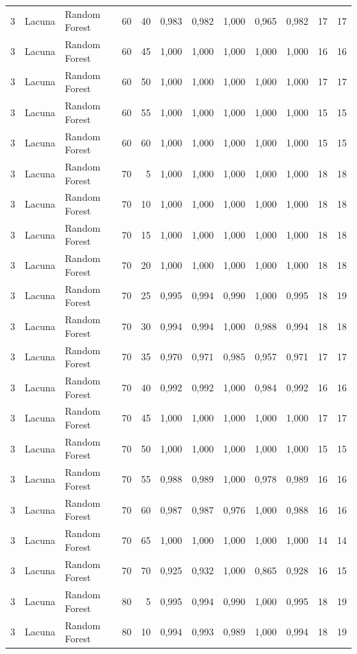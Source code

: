 \begin{longtable}{@{}rllrrrrrrrrr@{}}
3 & Lacuna & Random Forest & 60 & 40 & 0,983 & 0,982 & 1,000 & 0,965 & 0,982 & 17 & 17 \\
3 & Lacuna & Random Forest & 60 & 45 & 1,000 & 1,000 & 1,000 & 1,000 & 1,000 & 16 & 16 \\
3 & Lacuna & Random Forest & 60 & 50 & 1,000 & 1,000 & 1,000 & 1,000 & 1,000 & 17 & 17 \\
3 & Lacuna & Random Forest & 60 & 55 & 1,000 & 1,000 & 1,000 & 1,000 & 1,000 & 15 & 15 \\
3 & Lacuna & Random Forest & 60 & 60 & 1,000 & 1,000 & 1,000 & 1,000 & 1,000 & 15 & 15 \\
3 & Lacuna & Random Forest & 70 & 5 & 1,000 & 1,000 & 1,000 & 1,000 & 1,000 & 18 & 18 \\
3 & Lacuna & Random Forest & 70 & 10 & 1,000 & 1,000 & 1,000 & 1,000 & 1,000 & 18 & 18 \\
3 & Lacuna & Random Forest & 70 & 15 & 1,000 & 1,000 & 1,000 & 1,000 & 1,000 & 18 & 18 \\
3 & Lacuna & Random Forest & 70 & 20 & 1,000 & 1,000 & 1,000 & 1,000 & 1,000 & 18 & 18 \\
3 & Lacuna & Random Forest & 70 & 25 & 0,995 & 0,994 & 0,990 & 1,000 & 0,995 & 18 & 19 \\
3 & Lacuna & Random Forest & 70 & 30 & 0,994 & 0,994 & 1,000 & 0,988 & 0,994 & 18 & 18 \\
3 & Lacuna & Random Forest & 70 & 35 & 0,970 & 0,971 & 0,985 & 0,957 & 0,971 & 17 & 17 \\
3 & Lacuna & Random Forest & 70 & 40 & 0,992 & 0,992 & 1,000 & 0,984 & 0,992 & 16 & 16 \\
3 & Lacuna & Random Forest & 70 & 45 & 1,000 & 1,000 & 1,000 & 1,000 & 1,000 & 17 & 17 \\
3 & Lacuna & Random Forest & 70 & 50 & 1,000 & 1,000 & 1,000 & 1,000 & 1,000 & 15 & 15 \\
3 & Lacuna & Random Forest & 70 & 55 & 0,988 & 0,989 & 1,000 & 0,978 & 0,989 & 16 & 16 \\
3 & Lacuna & Random Forest & 70 & 60 & 0,987 & 0,987 & 0,976 & 1,000 & 0,988 & 16 & 16 \\
3 & Lacuna & Random Forest & 70 & 65 & 1,000 & 1,000 & 1,000 & 1,000 & 1,000 & 14 & 14 \\
3 & Lacuna & Random Forest & 70 & 70 & 0,925 & 0,932 & 1,000 & 0,865 & 0,928 & 16 & 15 \\
3 & Lacuna & Random Forest & 80 & 5 & 0,995 & 0,994 & 0,990 & 1,000 & 0,995 & 18 & 19 \\
3 & Lacuna & Random Forest & 80 & 10 & 0,994 & 0,993 & 0,989 & 1,000 & 0,994 & 18 & 19 \\

\end{longtable}
